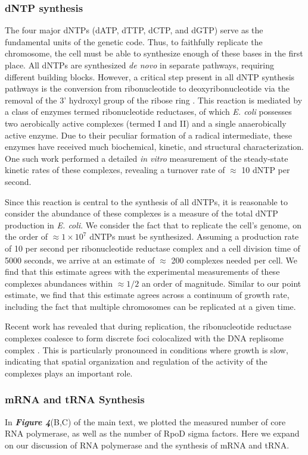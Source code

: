 \subsubsection{dNTP synthesis}
The four major dNTPs (dATP, dTTP, dCTP, and dGTP) serve as the fundamental
units of the genetic code. Thus, to faithfully replicate the chromosome, the
cell must be able to synthesize enough of these bases in the first place. All
dNTPs are synthesized \textit{de novo} in separate pathways, requiring
different building blocks. However, a critical step present in all dNTP
synthesis pathways is the conversion from ribonucleotide to
deoxyribonucleotide via the removal of the 3' hydroxyl group of the ribose
ring \citep{rudd2016}. This reaction is mediated by a class of enzymes termed
ribonucleotide reductases, of which \textit{E. coli} possesses two
aerobically active complexes (termed I and II) and a single anaerobically
active enzyme. Due to their peculiar formation of a radical intermediate,
these enzymes have received much biochemical, kinetic, and structural
characterization. One such work \citep{ge2003} performed a detailed
\textit{in vitro} measurement of the steady-state kinetic rates of these
complexes, revealing a turnover rate of $\approx$ 10 dNTP per second.

Since this reaction is central to the synthesis of all dNTPs, it is reasonable
to consider the abundance of these complexes is a measure of the total dNTP
production in \textit{E. coli}. We consider the fact that to replicate the
cell's genome, on the order of $\approx 1\times 10^{7}$ dNTPs must be
synthesized. Assuming a production rate of 10 per second per ribonucleotide
reductase complex and a cell division time of 5000 seconds, we arrive at an
estimate of $\approx$ 200 complexes needed per cell. We find that this estimate
agrees with the experimental measurements of these complexes abundances within
$\approx 1/2$ an order of magnitude. Similar to our point estimate, we find
that this estimate agrees  across a continuum of growth rate, including the fact
that multiple chromosomes can be replicated at a given time.

Recent work has revealed that during replication, the ribonucleotide
reductase complexes coalesce to form discrete foci colocalized with the DNA
replisome complex \citep{sanchez-romero2011}. This is particularly pronounced
in conditions where growth is slow, indicating that spatial organization and
regulation of the activity of the complexes plays an important role.

\subsubsection{mRNA and tRNA Synthesis}
In \textbf{\textit{Figure 4}}(B,C) of the main text, we plotted
the measured  number of core RNA polymerase, as well as the number of RpoD sigma
factors. Here we expand on our discussion of RNA polymerase and the synthesis of
mRNA and tRNA.

